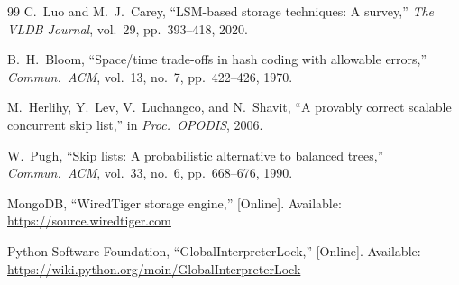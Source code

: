 \documentclass[oneside,a4paper,12pt]{book}
\begin{document}
\begin{thebibliography}{99}
C.~Luo and M.~J.~Carey, ``LSM-based storage techniques: A survey,'' \textit{The VLDB Journal}, vol.~29, pp.~393--418, 2020.

B.~H.~Bloom, ``Space/time trade-offs in hash coding with allowable errors,'' \textit{Commun.\ ACM}, vol.~13, no.~7, pp.~422--426, 1970.

M.~Herlihy, Y.~Lev, V.~Luchangco, and N.~Shavit, ``A provably correct scalable concurrent skip list,'' in \textit{Proc.\ OPODIS}, 2006.

W.~Pugh, ``Skip lists: A probabilistic alternative to balanced trees,'' \textit{Commun.\ ACM}, vol.~33, no.~6, pp.~668--676, 1990.

MongoDB, ``WiredTiger storage engine,'' [Online]. Available: \url{https://source.wiredtiger.com}

Python Software Foundation, ``GlobalInterpreterLock,'' [Online]. Available: \url{https://wiki.python.org/moin/GlobalInterpreterLock}

\end{thebibliography}
\end{document}
